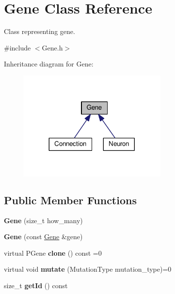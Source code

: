 \hypertarget{classGene}{}\section{Gene Class Reference}
\label{classGene}


Class representing gene.  




{\ttfamily \#include $<$Gene.\+h$>$}



Inheritance diagram for Gene\+:\nopagebreak
\begin{figure}[H]
\begin{center}
\leavevmode
\includegraphics[width=212pt]{classGene__inherit__graph}
\end{center}
\end{figure}
\subsection*{Public Member Functions}
\begin{DoxyCompactItemize}
\item 
{\bfseries Gene} (size\+\_\+t how\+\_\+many)\hypertarget{classGene_a64133f3ef65cc55daa3bc61085ebdade}{}\label{classGene_a64133f3ef65cc55daa3bc61085ebdade}

\item 
{\bfseries Gene} (const \hyperlink{classGene}{Gene} \&gene)\hypertarget{classGene_a7550abdded94171f54ad084d9d16a5c8}{}\label{classGene_a7550abdded94171f54ad084d9d16a5c8}

\item 
virtual P\+Gene {\bfseries clone} () const =0\hypertarget{classGene_a09f14ad635c9c68390a7e554791b699c}{}\label{classGene_a09f14ad635c9c68390a7e554791b699c}

\item 
virtual void {\bfseries mutate} (Mutation\+Type mutation\+\_\+type)=0\hypertarget{classGene_a92d8b7cf84975c65a12415e13c2eece5}{}\label{classGene_a92d8b7cf84975c65a12415e13c2eece5}

\item 
size\+\_\+t {\bfseries get\+Id} () const \hypertarget{classGene_ac306ce3d6384eed8f4583c05523e39e9}{}\label{classGene_ac306ce3d6384eed8f4583c05523e39e9}

\end{DoxyCompactItemize}
